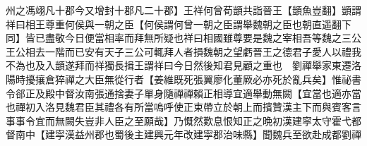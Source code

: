 州之馮翊凡十郡今又增封十郡凡二十郡】王祥何曾荀顗共詣晉王【顗魚豈翻】顗謂祥曰相王尊重何侯與一朝之臣【何侯謂何曾一朝之臣謂舉魏朝之臣也朝直遥翻下同】皆已盡敬今日便當相率而拜無所疑也祥曰相國雖尊要是魏之宰相吾等魏之三公王公相去一階而已安有天子三公可輒拜人者損魏朝之望虧晉王之德君子愛人以禮我不為也及入顗遂拜而祥獨長揖王謂祥曰今日然後知君見顧之重也　劉禪舉家東遷洛陽時擾攘倉猝禪之大臣無從行者【姜維既死張翼廖化董厥必亦死於亂兵矣】惟祕書令郤正及殿中督汝南張通捨妻子單身隨禪禪賴正相導宜適舉動無闕【宜當也適亦當也禪初入洛見魏君臣其禮各有所當嗚呼使正束帶立於朝上而擯贊漢主下而與賓客言事事令宜而無闕失豈非人臣之至願哉】乃慨然歎息恨知正之晩初漢建寜太守霍弋都督南中【建寜漢益州郡也蜀後主建興元年改建寜郡治味縣】聞魏兵至欲赴成都劉禪